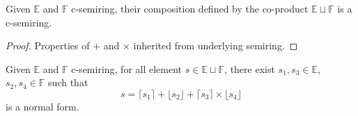 \begin{proposition}
	Given $\mathbb{E}$ and $\mathbb{F}$ c-semiring, their composition defined by the co-product $\mathbb{E} \sqcup \mathbb{F}$ is a c-semiring.
\end{proposition}
\begin{proof}Properties of + and $\times$ inherited from underlying semiring.
\end{proof}

\begin{proposition} Given $\mathbb{E}$ and $\mathbb{F}$ c-semiring, for all element $s \in \mathbb{E} \sqcup \mathbb{F}$, there exist $s_1,s_3 \in \mathbb{E}$, $s_2,s_4 \in \mathbb{F}$ such that
	$$
	s = \lceil s_1 \rceil + \lfloor s_2 \rfloor + \lceil s_3 \rceil \times \lfloor s_4 \rfloor
	$$
	is a normal form.
\end{proposition}
